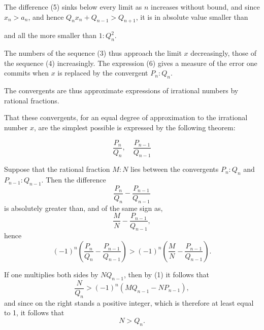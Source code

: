 
The difference (5) sinks below every limit as $n$ increases
without bound, and since $x_n > a_n$, and hence $Q_n x_n + Q_{n-1} > Q_{n+1}$,
it is in absolute value smaller than

and all the more smaller than $1 : Q_n^2$.

The numbers of the sequence (3) thus approach the limit $x$
decreasingly, those of the sequence (4) increasingly. The expression (6)
gives a measure of the error one commits when $x$ is replaced by
the convergent $P_n : Q_n$.

The convergents are thus approximate expressions
of irrational numbers by rational
fractions.

That these convergents, for an equal degree of approximation
to the irrational number $x$, are the simplest possible
is expressed by the following theorem:

\[
\frac{P_n}{Q_n}, \quad \frac{P_{n-1}}{Q_{n-1}}
\]

Suppose that the rational fraction $M : N$ lies between
the convergents $P_n : Q_n$ and $P_{n-1} : Q_{n-1}$. Then the
difference
\[
\frac{P_n}{Q_n} - \frac{P_{n-1}}{Q_{n-1}}
\]
is absolutely greater than, and of the same sign as,
\[
\frac{M}{N} - \frac{P_{n-1}}{Q_{n-1}},
\]
hence
\[
(-1)^n \left(\frac{P_n}{Q_n} - \frac{P_{n-1}}{Q_{n-1}}\right) > (-1)^n \left(\frac{M}{N} - \frac{P_{n-1}}{Q_{n-1}}\right).
\]

If one multiplies both sides by $N Q_{n-1}$, then by (1) it follows that
\[
\frac{N}{Q_n} > (-1)^n (M Q_{n-1} - N P_{n-1}),
\]
and since on the right stands a positive integer, which is therefore at least
equal to 1, it follows that
\[
N > Q_n.
\]
